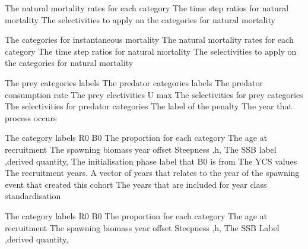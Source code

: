  {The natural mortality rates for each category}
 {The time step ratios for natural mortality}
 {The selectivities to apply on the categories for natural mortality}
\par\textbf{}\par
{} {The categories for instantaneous mortality}
 {The natural mortality rates for each category}
 {The time step ratios for natural mortality}
 {The selectivities to apply on the categories for natural mortality}
\par\textbf{}\par
{} {The prey categories labels}
 {The predator categories labels}
 {The predator consumption rate}
 {The prey electivities}
 {U max}
 {The selectivities for prey categories}
 {The selectivities for predator categories}
 {The label of the penalty}
 {The year that process occurs}
\par\textbf{}\par
{} {The category labels}
 {R0}
 {B0}
 {The proportion for each category}
 {The age at recruitment}
 {The spawning biomass year offset}
 {Steepness ,h,}
 {The SSB label ,derived quantity,}
 {The initialisation phase label that B0 is from}
 {The YCS values}
 {The recruitment years. A vector of years that relates to the year of the spawning event that created this cohort}
 {The years that are included for year class standardisation}
\par\textbf{}\par
{} {The category labels}
 {R0}
 {B0}
 {The proportion for each category}
 {The age at recruitment}
 {The spawning biomass year offset}
 {Steepness ,h,}
 {The SSB Label ,derived quantity,}
